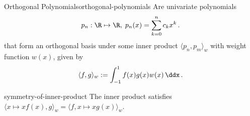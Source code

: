 \begin{definition}{Orthogonal Polynomials}{orthogonal-polynomials}
  Are univariate polynomials
  $$p_n: \R \mapsto \R, \; p_n(x) = \sum_{k=0}^{n} c_k x^k\,.$$
  that form an orthogonal basis under some inner product $\langle p_n, p_m \rangle_w$ with weight function $w(x)$, given by
  $$\langle f, g \rangle_w := \int_{-1}^{1} f(x) g(x) w(x) \,\ddx\,.$$
\end{definition}

\begin{remark}{}{symmetry-of-inner-product}
  The inner product satisfies $\langle x\mapsto xf(x), g \rangle_w = \langle f, x \mapsto xg(x)\rangle_w$.
\end{remark}
